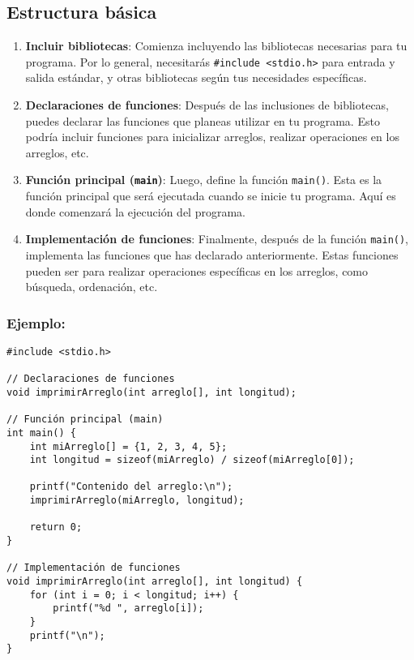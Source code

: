 \documentclass{article}
\begin{document}
\subsection{Estructura básica}
\begin{enumerate}
    \item \textbf{Incluir bibliotecas}: Comienza incluyendo las bibliotecas necesarias para tu programa. Por lo general, necesitarás \texttt{\#include <stdio.h>} para entrada y salida estándar, y otras bibliotecas según tus necesidades específicas.
    
    \item \textbf{Declaraciones de funciones}: Después de las inclusiones de bibliotecas, puedes declarar las funciones que planeas utilizar en tu programa. Esto podría incluir funciones para inicializar arreglos, realizar operaciones en los arreglos, etc.
    
    \item \textbf{Función principal (\texttt{main})}: Luego, define la función \texttt{main()}. Esta es la función principal que será ejecutada cuando se inicie tu programa. Aquí es donde comenzará la ejecución del programa.
    
    \item \textbf{Implementación de funciones}: Finalmente, después de la función \texttt{main()}, implementa las funciones que has declarado anteriormente. Estas funciones pueden ser para realizar operaciones específicas en los arreglos, como búsqueda, ordenación, etc.
\end{enumerate}

\subsubsection{Ejemplo:}

\begin{verbatim}
#include <stdio.h>

// Declaraciones de funciones
void imprimirArreglo(int arreglo[], int longitud);

// Función principal (main)
int main() {
    int miArreglo[] = {1, 2, 3, 4, 5};
    int longitud = sizeof(miArreglo) / sizeof(miArreglo[0]);

    printf("Contenido del arreglo:\n");
    imprimirArreglo(miArreglo, longitud);

    return 0;
}

// Implementación de funciones
void imprimirArreglo(int arreglo[], int longitud) {
    for (int i = 0; i < longitud; i++) {
        printf("%d ", arreglo[i]);
    }
    printf("\n");
}
\end{verbatim}
\end{document}
